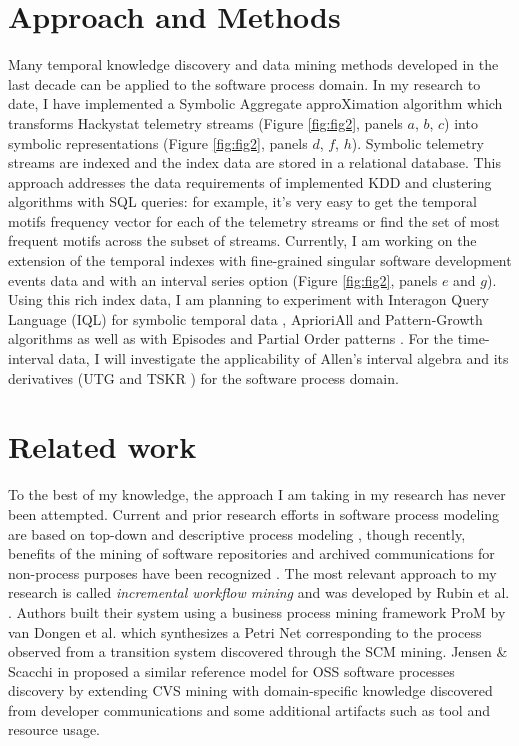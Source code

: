 \documentclass[11pt,oneside]{article}
\begin{document}
\section{Approach and Methods}
Many temporal knowledge discovery and data mining methods developed in the last decade can be applied to the software process domain. In my research to date, I have implemented a Symbolic Aggregate approXimation algorithm \cite{citeulike:2821475} which transforms Hackystat telemetry streams (Figure \ref{fig:fig2}, panels $a$, $b$, $c$) into symbolic representations (Figure \ref{fig:fig2}, panels $d$, $f$, $h$). Symbolic telemetry streams are indexed and the index data are stored in a relational database. This approach addresses the data requirements of implemented KDD and clustering algorithms with SQL queries: for example, it's very easy to get the temporal motifs frequency vector for each of the telemetry streams or find the set of most frequent motifs across the subset of streams. Currently, I am working on the extension of the temporal indexes with fine-grained singular software development events data and with an interval series option (Figure \ref{fig:fig2}, panels $e$ and $g$). Using this rich index data, I am planning to experiment with Interagon Query Language (IQL) for symbolic temporal data \cite{citeulike:5043086}, AprioriAll \cite{citeulike:775528} and Pattern-Growth algorithms \cite{citeulike:5043097} as well as with Episodes \cite{citeulike:5043099} and Partial Order patterns \cite{citeulike:5043101}. For the time-interval data, I will investigate the applicability of Allen's interval algebra \cite{citeulike:191348} and its derivatives (UTG \cite{citeulike:5043086} and TSKR \cite{citeulike:3978076}) for the software process domain. 

\section{Related work}
To the best of my knowledge, the approach I am taking in my research has never been attempted. Current and prior research efforts in software process modeling are based on top-down and descriptive process modeling \cite{citeulike:5043670}, though recently, benefits of the mining of software repositories and archived communications for non-process purposes have been recognized \cite{citeulike:5043676}. The most relevant approach to my research is called \textit{incremental workflow mining} and was developed by Rubin et al. \cite{citeulike:1885717}. Authors built their system using a business process mining framework ProM by van Dongen et al. \cite{citeulike:5043673} which synthesizes a Petri Net corresponding to the process observed from a transition system discovered through the SCM mining. Jensen \& Scacchi in \cite{citeulike:5043664} proposed a similar reference model for OSS software processes discovery by extending CVS mining with domain-specific knowledge discovered from developer communications and some additional artifacts such as tool and resource usage. 
\end{document}
